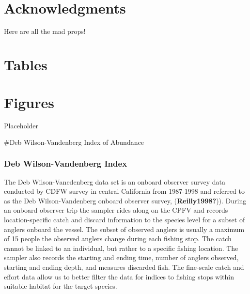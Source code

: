 \documentclass[11pt,
  english,
  a4paper,
]{article}
\begin{document}
\leavevmode\tagmcend\tagstructend


\hypertarget{acknowledgments}{%
\section{Acknowledgments}\label{acknowledgments}}

\leavevmode\tagmcend\tagstructend

Here are all the mad props!

\clearpage


\hypertarget{tables}{%
\section{Tables}\label{tables}}

\leavevmode\tagmcend\tagstructend


\hypertarget{figures}{%
\section{Figures}\label{figures}}

\leavevmode\tagmcend\tagstructend

Placeholder

\#Deb Wilson-Vandenberg Index of Abundance


\hypertarget{deb-wilson-vandenberg-index}{%
\subsubsection{Deb Wilson-Vandenberg Index}\label{deb-wilson-vandenberg-index}}

\leavevmode\tagmcend\tagstructend

The Deb Wilson-Vanedenberg data set is an onboard observer survey data conducted by CDFW survey in central California from 1987-1998 and referred to as the Deb Wilson-Vandenberg onboard observer survey, {(\textbf{Reilly1998?})\leavevmode\tagmcend\tagstructend}). During an onboard observer trip the sampler rides along on the CPFV and records location-specific catch and discard information to the species level for a subset of anglers onboard the vessel. The subset of observed anglers is usually a maximum of 15 people the observed anglers change during each fishing stop. The catch cannot be linked to an individual, but rather to a specific fishing location. The sampler also records the starting and ending time, number of anglers observed, starting and ending depth, and measures discarded fish. The fine-scale catch and effort data allow us to better filter the data for indices to fishing stops within suitable habitat for the target species.
\end{document}
